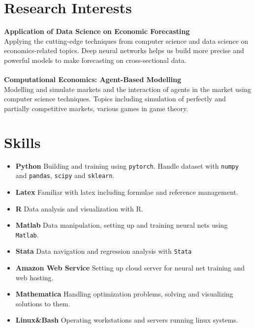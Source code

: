 \documentclass[a4paper,10pt]{article}
\begin{document}
\section{Research Interests}
     \textbf{Application of Data Science on Economic Forecasting} \\
     Applying the cutting-edge techniques from computer science and data science on economics-related topics. Deep neural networks helps us build more precise and powerful models to make forecasting on cross-sectional data. \\
     \quad \\
     \textbf{Computational Economics: Agent-Based Modelling} \\
     Modelling and simulate markets and the interaction of agents in the market using computer science techniques. Topics including simulation of perfectly and partially competitive markets, various games in game theory.


\section{Skills}
	\begin{itemize}
    \item \textbf{Python} Building and training using \texttt{pytorch}. Handle dataset with \texttt{numpy} and \texttt{pandas}, \texttt{scipy} and \texttt{sklearn}.
    \item \textbf{Latex} Familiar with latex including formulae and reference management.
    \item \textbf{R} Data analysis and visualization with R.
    \item \textbf{Matlab} Data manipulation, setting up and training neural nets using \texttt{Matlab}. 
    \item \textbf{Stata} Data navigation and regression analysis with \texttt{Stata} 
	\item \textbf{Amazon Web Service} Setting up cloud server for neural net training and web hosting. 
    \item \textbf{Mathematica} Handling optimization problems, solving and visualizing solutions to them.
    \item \textbf{Linux\&Bash} Operating workstations and servers running linux systems.
   	\end{itemize}
    
\end{document}
